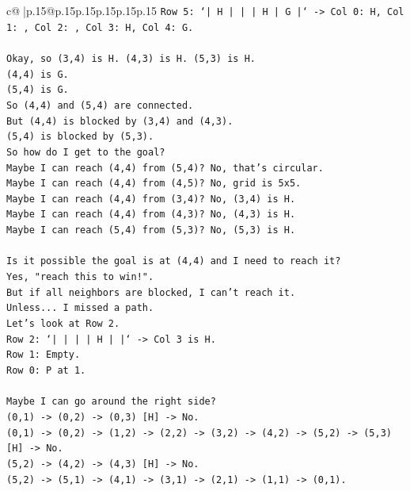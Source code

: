 \documentclass{article}
\begin{document}
{\begin{supertabular}{c@{$\;$}|p{.15\linewidth}@{}p{.15\linewidth}p{.15\linewidth}p{.15\linewidth}p{.15\linewidth}p{.15\linewidth}}
{{{\texttt{Row 5: `|  H  |     |     |  H  |  G  |` {-}> Col 0: H, Col 1: , Col 2: , Col 3: H, Col 4: G.} \\
\\ 
\texttt{Okay, so (3,4) is H. (4,3) is H. (5,3) is H.} \\
\texttt{(4,4) is G.} \\
\texttt{(5,4) is G.} \\
\texttt{So (4,4) and (5,4) are connected.} \\
\texttt{But (4,4) is blocked by (3,4) and (4,3).} \\
\texttt{(5,4) is blocked by (5,3).} \\
\texttt{So how do I get to the goal?} \\
\texttt{Maybe I can reach (4,4) from (5,4)? No, that's circular.} \\
\texttt{Maybe I can reach (4,4) from (4,5)? No, grid is 5x5.} \\
\texttt{Maybe I can reach (4,4) from (3,4)? No, (3,4) is H.} \\
\texttt{Maybe I can reach (4,4) from (4,3)? No, (4,3) is H.} \\
\texttt{Maybe I can reach (5,4) from (5,3)? No, (5,3) is H.} \\
\\ 
\texttt{Is it possible the goal is at (4,4) and I need to reach it?} \\
\texttt{Yes, "reach this to win!".} \\
\texttt{But if all neighbors are blocked, I can't reach it.} \\
\texttt{Unless... I missed a path.} \\
\texttt{Let's look at Row 2.} \\
\texttt{Row 2: `|     |     |     |  H  |     |` {-}> Col 3 is H.} \\
\texttt{Row 1: Empty.} \\
\texttt{Row 0: P at 1.} \\
\\ 
\texttt{Maybe I can go around the right side?} \\
\texttt{(0,1) {-}> (0,2) {-}> (0,3) {[}H{]} {-}> No.} \\
\texttt{(0,1) {-}> (0,2) {-}> (1,2) {-}> (2,2) {-}> (3,2) {-}> (4,2) {-}> (5,2) {-}> (5,3) {[}H{]} {-}> No.} \\
\texttt{(5,2) {-}> (4,2) {-}> (4,3) {[}H{]} {-}> No.} \\
\texttt{(5,2) {-}> (5,1) {-}> (4,1) {-}> (3,1) {-}> (2,1) {-}> (1,1) {-}> (0,1).} \\
}}}
\end{supertabular}}
\end{document}
